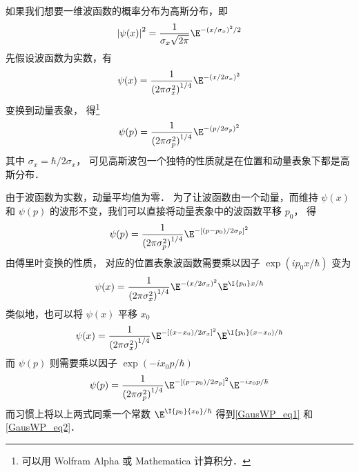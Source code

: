 如果我们想要一维波函数的概率分布为高斯分布，即
\begin{equation}
{\left| {\psi (x)} \right|^2} = \frac{1}{\sigma_x \sqrt {2\pi } }{\E^{ - {{(x/\sigma_x )}^2}/2}}
\end{equation}
先假设波函数为实数，有
\begin{equation}
\psi (x) = \frac{1}{{(2\pi {\sigma_x ^2})}^{1/4}}{\E^{ - {{(x/2\sigma_x )}^2}}}
\end{equation}
变换到动量表象，%
得\footnote{可以用 Wolfram Alpha 或 Mathematica 计算积分．}
\begin{equation}
\psi (p) = \frac{1}{{(2\pi {\sigma_p ^2})}^{1/4}}{\E^{ - {{(p/2\sigma_p )}^2}}}
\end{equation}
其中 ${\sigma_x} = \hbar /2{\sigma_x}$， %
可见高斯波包一个独特的性质就是在位置和动量表象下都是高斯分布．

由于波函数为实数，动量平均值为零．%
为了让波函数由一个动量，而维持 $\psi(x)$ 和 $\psi(p)$ %
的波形不变，我们可以直接将动量表象中的波函数平移 $p_0$， 得
\begin{equation}
\psi (p) = \frac{1}{{(2\pi \sigma_p^2)}^{1/4}}{\E^{ - {{[(p - {p_0})/2{\sigma_p}]}^2}}}
\end{equation}
由傅里叶变换的性质，%
对应的位置表象波函数需要乘以因子 $\exp(i p_0 x/\hbar)$ 变为
\begin{equation}
\psi (x) = \frac{1}{{(2\pi {\sigma_x ^2})}^{1/4}}{\E^{ - {{(x/2\sigma_x )}^2}}}{\E^{\I {p_0}x/{\hbar }}}
\end{equation}
类似地，也可以将 $\psi(x)$ 平移 $x_0$ 
\begin{equation}
\psi (x) = \frac{1}{{(2\pi {\sigma_x ^2})}^{1/4}}{\E^{ - {{[(x-x_0)/2\sigma_x ]}^2}}}{\E^{\I {p_0}(x-x_0)/{\hbar }}}
\end{equation}
而 $\psi(p)$ 则需要乘以因子 $\exp ( - i{x_0}p/\hbar )$
\begin{equation}
\psi (p) = \frac{1}{{(2\pi \sigma_p^2)}^{1/4}}{\E^{ - {{[(p - {p_0})/2{\sigma_p}]}^2}}}{\E^{ - i{x_0}p/\hbar }}
\end{equation}
而习惯上将以上两式同乘一个常数%
 ${\E^{\I{p_0}{x_0}/\hbar }}$ 得到\autoref{GausWP_eq1} 和\autoref{GausWP_eq2}． 


